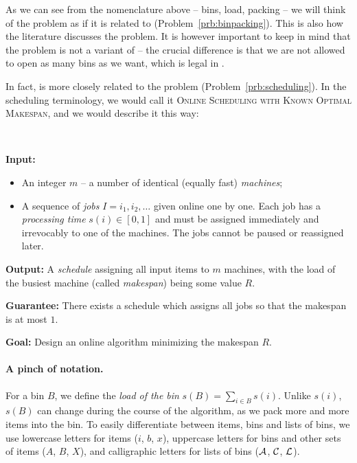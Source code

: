 As we can see from the nomenclature above -- bins, load, packing -- we
will think of the problem as if it is related to \binpacking
(Problem~\ref{prb:binpacking}). This is also how the literature
discusses the problem.  It is however important to keep in mind that
the problem is not a variant of \binpacking -- the crucial difference
is that we are not allowed to open as many bins as we want, which is
legal in \binpacking.

In fact, \binstretch is more closely related to the problem \scheduling
(Problem~\ref{prb:scheduling}). In the scheduling terminology, we
would call it \textsc{Online Scheduling with Known Optimal Makespan},
and we would describe it this way:
\goodbreak

\begin{prb}~
\smallskip

\noindent\textbf{Input:}

\begin{itemize}
\item An integer $m$ -- a number of identical (equally fast) \emph{machines};
\item A sequence of \emph{jobs} $I=i_1, i_2, \ldots$ given online one by one. Each job has
a \textit{processing time} $s(i) \in [0,1]$ and must be assigned immediately and irrevocably
to one of the machines. The jobs cannot be paused or reassigned later.
\end{itemize}

\noindent
\textbf{Output:} A \emph{schedule} assigning all input items to $m$ machines, with the
load of the busiest machine (called \emph{makespan}) being some value
$R$.

\noindent
\textbf{Guarantee:} There exists a schedule which assigns all jobs so that
the makespan is at most $1$.

\noindent
\textbf{Goal:} Design an online algorithm minimizing the makespan $R$.
\smallskip
\end{prb}

\paragraph{A pinch of notation.} For a bin $B$, we define the
\textit{load of the bin} $s(B) = \sum_{i \in B} s(i)$. Unlike
$s(i)$, $s(B)$ can change during the course of the algorithm, as we
pack more and more items into the bin. To easily differentiate between
items, bins and lists of bins, we use lowercase letters for items
($i$, $b$, $x$), uppercase letters for bins and other sets of items
($A$, $B$, $X$), and calligraphic letters for lists of bins (${\mathcal A}$,
${\mathcal C}$, ${\mathcal L}$).

